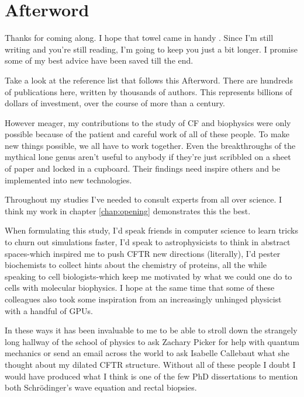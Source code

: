 \chapter{Afterword}
\label{chap:Afterword}

Thanks for coming along. I hope that towel came in handy \cite{adams1979}. Since I'm still writing and you're still reading, I'm going to keep you just a bit longer. I promise some of my best advice have been saved till the end. 

Take a look at the reference list that follows this Afterword. There are hundreds of publications here, written by thousands of authors. This represents billions of dollars of investment, over the course of more than a century. 

However meager, my contributions to the study of CF and biophysics were only possible because of the patient and careful work of all of these people. To make new things possible, we all have to work together. Even the breakthroughs of the mythical lone genus aren't useful to anybody if they're just scribbled on a sheet of paper and locked in a cupboard. Their findings need inspire others and be implemented into new technologies.

Throughout my studies I've needed to consult experts from all over science. I think my work in chapter \ref{chap:opening} demonstrates this the best. 

When formulating this study, I'd speak friends in computer science to learn tricks to churn out simulations faster, I'd speak to astrophysicists to think in abstract spaces-which inspired me to push CFTR new directions (literally), I'd pester biochemists to collect hints about the chemistry of proteins, all the while speaking to cell biologists-which keep me motivated by what we could one do to cells with molecular biophysics. I hope at the same time that some of these colleagues also took some inspiration from an increasingly unhinged physicist with a handful of GPUs. 

In these ways it has been invaluable to me to be able to stroll down the strangely long hallway of the school of physics to ask Zachary Picker for help with quantum mechanics or send an email across the world to ask Isabelle Callebaut what she thought about my dilated CFTR structure. Without all of these people I doubt I would have produced what I think is one of the few PhD dissertations to mention both Schr\"odinger's wave equation and rectal biopsies. 

